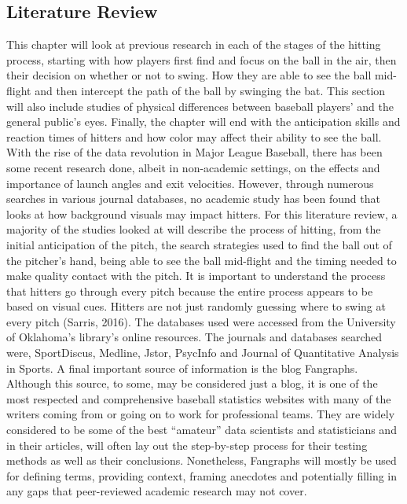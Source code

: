 \documentclass{article}
\begin{document}
\begin{doublespace}
\section{Literature Review}
This chapter will look at previous research in each of the stages of the hitting process, starting with how players first find and focus on the ball in the air, then their decision on whether or not to swing. How they are able to see the ball mid-flight and then intercept the path of the ball by swinging the bat. This section will also include studies of physical differences between baseball players’ and the general public’s eyes. Finally, the chapter will end with the anticipation skills and reaction times of hitters and how color may affect their ability to see the ball.  
With the rise of the data revolution in Major League Baseball, there has been some recent research done, albeit in non-academic settings, on the effects and importance of launch angles and exit velocities. However, through numerous searches in various journal databases, no academic study has been found that looks at how background visuals may impact hitters. For this literature review, a majority of the studies looked at will describe the process of hitting, from the initial anticipation of the pitch, the search strategies used to find the ball out of the pitcher’s hand, being able to see the ball mid-flight and the timing needed to make quality contact with the pitch. It is important to understand the process that hitters go through every pitch because the entire process appears to be based on visual cues. Hitters are not just randomly guessing where to swing at every pitch (Sarris, 2016). The databases used were accessed from the University of Oklahoma’s library’s online resources. The journals and databases searched were, SportDiscus, Medline, Jstor, PsycInfo and Journal of Quantitative Analysis in Sports. A final important source of information is the blog Fangraphs. Although this source, to some, may be considered just a blog, it is one of the most respected and comprehensive baseball statistics websites with many of the writers coming from or going on to work for professional teams. They are widely considered to be some of the best “amateur” data scientists and statisticians and in their articles, will often lay out the step-by-step process for their testing methods as well as their conclusions. Nonetheless, Fangraphs will mostly be used for defining terms, providing context, framing anecdotes and potentially filling in any gaps that peer-reviewed academic research may not cover. 


\end{doublespace}
\end{document}
